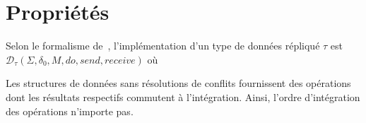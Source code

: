 
\section{Propriétés}
\label{crdts:sec:properties}

Selon le formalisme de~\cite{burckhardt2014replicated}, l'implémentation d'un
type de données répliqué $\tau$ est
$\mathcal{D}_\tau(\Sigma, \delta_0, M, do, send, receive)$ où 

Les structures de données sans résolutions de conflits
fournissent des opérations dont les résultats respectifs commutent à
l'intégration. Ainsi, l'ordre d'intégration des opérations n'importe pas.

